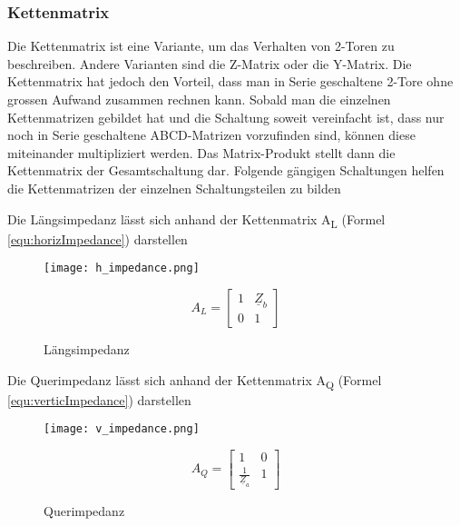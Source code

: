 \subsubsection{Kettenmatrix}\label{subsec:kettenmatrix}

Die Kettenmatrix ist eine Variante, um das Verhalten von 2-Toren zu beschreiben. Andere Varianten sind die Z-Matrix oder die Y-Matrix. Die Kettenmatrix hat jedoch den Vorteil, dass man in Serie geschaltene 2-Tore ohne grossen Aufwand zusammen rechnen kann. Sobald man die einzelnen Kettenmatrizen gebildet hat und die Schaltung soweit vereinfacht ist, dass nur noch in Serie geschaltene ABCD-Matrizen vorzufinden sind, können diese miteinander multipliziert werden. Das Matrix-Produkt stellt dann die Kettenmatrix der Gesamtschaltung dar. Folgende gängigen Schaltungen helfen die Kettenmatrizen der einzelnen Schaltungsteilen zu bilden

Die Längsimpedanz lässt sich anhand der Kettenmatrix A\textsubscript{L} (Formel \ref{equ:horizImpedance}) darstellen
\begin{figure}[H]
	\begin{minipage}[h]{0.45\linewidth}
		\centering
		\texttt{[image: h\_impedance.png]}
		\caption{Längsimpedanz \cite{2torTabelle}}
	\end{minipage}
	\begin{minipage}[h]{0.45\linewidth}
		\centering
		\begin{equation}\label{equ:horizImpedance}
			A_L = \left[\begin{matrix}
			1&\underline{Z}_b\\0&1
			\end{matrix}\right]
		\end{equation}
	\end{minipage}
\end{figure}
Die Querimpedanz lässt sich anhand der Kettenmatrix A\textsubscript{Q} (Formel \ref{equ:verticImpedance}) darstellen
\begin{figure}[H]
	\begin{minipage}[h]{0.45\linewidth}
		\centering
		\texttt{[image: v\_impedance.png]}
		\caption{Querimpedanz \cite{2torTabelle}}
	\end{minipage}
	\begin{minipage}[h]{0.45\linewidth}
		\centering
		\begin{equation}\label{equ:verticImpedance}
			A_Q = \left[\begin{matrix}
			1&0\\\frac{1}{\underline{Z}_a}&1
			\end{matrix}\right]
		\end{equation}
	\end{minipage}
\end{figure}


